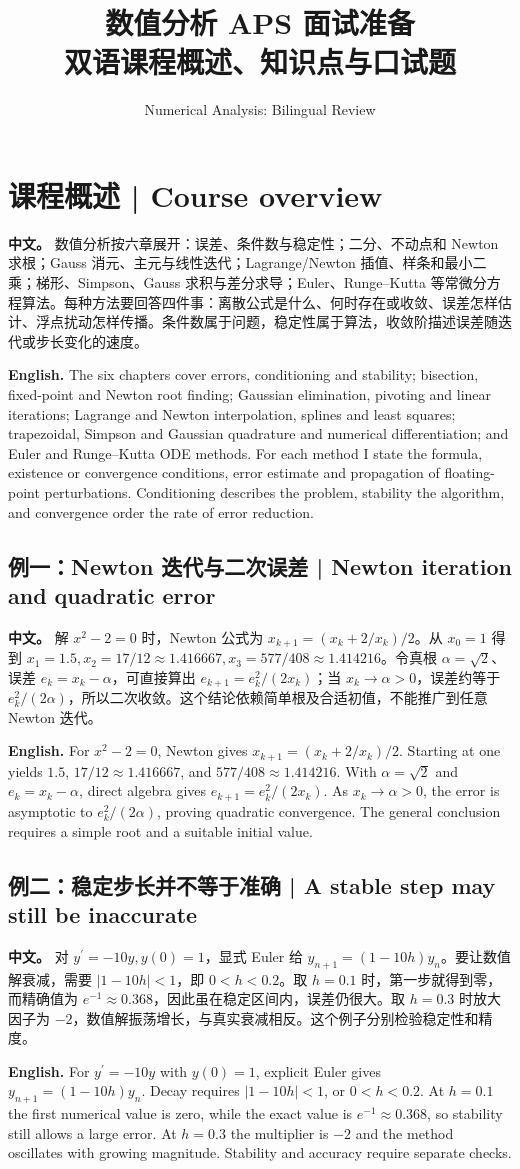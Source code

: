\documentclass[UTF8,11pt,a4paper]{ctexart}
\title{数值分析 APS 面试准备\\[4pt]\large 双语课程概述、知识点与口试题}
\author{Numerical Analysis: Bilingual Review}
\date{}
\newcommand{\APS}[2]{\par\noindent\textbf{中文。} #1\par\noindent\textbf{English.} #2\par\smallskip}
\begin{document}
\maketitle
\section*{课程概述 | Course overview}
\APS{数值分析按六章展开：误差、条件数与稳定性；二分、不动点和 Newton 求根；Gauss 消元、主元与线性迭代；Lagrange/Newton 插值、样条和最小二乘；梯形、Simpson、Gauss 求积与差分求导；Euler、Runge--Kutta 等常微分方程算法。每种方法要回答四件事：离散公式是什么、何时存在或收敛、误差怎样估计、浮点扰动怎样传播。条件数属于问题，稳定性属于算法，收敛阶描述误差随迭代或步长变化的速度。}{The six chapters cover errors, conditioning and stability; bisection, fixed-point and Newton root finding; Gaussian elimination, pivoting and linear iterations; Lagrange and Newton interpolation, splines and least squares; trapezoidal, Simpson and Gaussian quadrature and numerical differentiation; and Euler and Runge--Kutta ODE methods. For each method I state the formula, existence or convergence conditions, error estimate and propagation of floating-point perturbations. Conditioning describes the problem, stability the algorithm, and convergence order the rate of error reduction.}
\subsection*{例一：Newton 迭代与二次误差 | Newton iteration and quadratic error}
\APS{解 $x^2-2=0$ 时，Newton 公式为 $x_{k+1}=(x_k+2/x_k)/2$。从 $x_0=1$ 得到 $x_1=1.5,x_2=17/12\approx1.416667,x_3=577/408\approx1.414216$。令真根 $\alpha=\sqrt2$、误差 $e_k=x_k-\alpha$，可直接算出 $e_{k+1}=e_k^2/(2x_k)$；当 $x_k\to\alpha>0$，误差约等于 $e_k^2/(2\alpha)$，所以二次收敛。这个结论依赖简单根及合适初值，不能推广到任意 Newton 迭代。}{For $x^2-2=0$, Newton gives $x_{k+1}=(x_k+2/x_k)/2$. Starting at one yields $1.5$, $17/12\approx1.416667$, and $577/408\approx1.414216$. With $\alpha=\sqrt2$ and $e_k=x_k-\alpha$, direct algebra gives $e_{k+1}=e_k^2/(2x_k)$. As $x_k\to\alpha>0$, the error is asymptotic to $e_k^2/(2\alpha)$, proving quadratic convergence. The general conclusion requires a simple root and a suitable initial value.}
\subsection*{例二：稳定步长并不等于准确 | A stable step may still be inaccurate}
\APS{对 $y^{\prime}=-10y,y(0)=1$，显式 Euler 给 $y_{n+1}=(1-10h)y_n$。要让数值解衰减，需要 $|1-10h|<1$，即 $0<h<0.2$。取 $h=0.1$ 时，第一步就得到零，而精确值为 $e^{-1}\approx0.368$，因此虽在稳定区间内，误差仍很大。取 $h=0.3$ 时放大因子为 $-2$，数值解振荡增长，与真实衰减相反。这个例子分别检验稳定性和精度。}{For $y^{\prime}=-10y$ with $y(0)=1$, explicit Euler gives $y_{n+1}=(1-10h)y_n$. Decay requires $|1-10h|<1$, or $0<h<0.2$. At $h=0.1$ the first numerical value is zero, while the exact value is $e^{-1}\approx0.368$, so stability still allows a large error. At $h=0.3$ the multiplier is $-2$ and the method oscillates with growing magnitude. Stability and accuracy require separate checks.}
\end{document}
